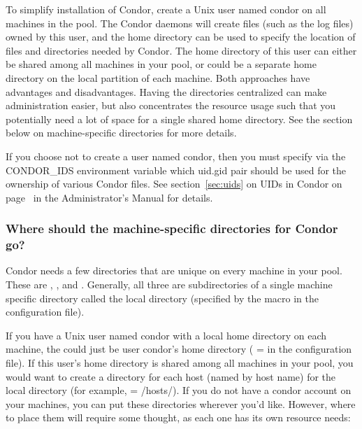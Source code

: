 To simplify installation of Condor,
create a Unix user named condor on all machines in the pool.
The Condor daemons will create files
(such as the log files) owned by this user,
and the home directory can be used to specify the location of files
and directories needed by Condor.  The home directory of this user can
either be shared among all machines in your pool, or could be a
separate home directory on the local partition of each machine.  Both
approaches have advantages and disadvantages.  Having the directories
centralized can make administration easier, but also concentrates the
resource usage such that you potentially need a lot of space for a
single shared home directory.  See the section below on
machine-specific directories for more details.

If you choose not to create a user named condor,
then you must specify via the
CONDOR\_IDS environment variable which uid.gid pair should be used for
the ownership of various Condor files.  See section~\ref{sec:uids} on
UIDs in Condor on page~\pageref{sec:uids} in the Administrator's
Manual for details.

\subsubsection{Where should the machine-specific directories for
Condor go?} 

Condor needs a few directories that are unique on every machine in
your pool.  These are 
, 
, and 
.  Generally, all
three are subdirectories of a single machine specific directory called
the local directory (specified by the  macro
in the configuration file).

If you have a Unix user named condor with a local home directory on each
machine, the  could just be user condor's home
directory ( =  in the 
configuration file).
If this user's home directory is shared among all machines in your
pool, you would want to create a directory for each host (named by
host name) for the local directory (for example,  =
/hosts/).  If you do not
have a condor account on your machines, you can put these directories
wherever you'd like.  However, where to place them will require some
thought, as each one has its own resource needs:

